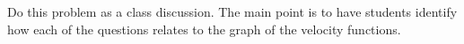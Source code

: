 \documentclass[noinstructornotes]{ximera}
\begin{document}
\begin{instructorNotes}
Do this problem as a class discussion.  
The main point is to have students identify how each of the questions relates to the graph of the velocity functions.
\end{instructorNotes}
















	
	
	
	
	
	
	
	
	

	










								
				
				
	
\end{document}
